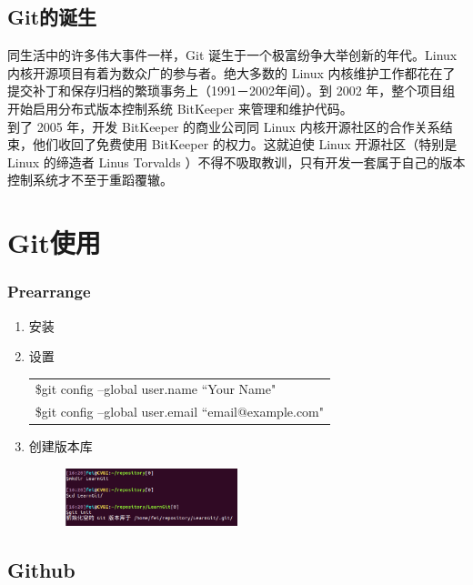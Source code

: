 \documentclass[notheorems,mathserif,table,compress]{beamer}  %
\begin{document}
\subsection{Git的诞生}

\begin{frame}
  同生活中的许多伟大事件一样，Git 诞生于一个极富纷争大举创新的年代。Linux 内核开源项目有着为数众广的参与者。绝大多数的 Linux 内核维护工作都花在了提交补丁和保存归档的繁琐事务上（1991－2002年间）。到 2002 年，整个项目组开始启用分布式版本控制系统   BitKeeper 来管理和维护代码。\\
  到了 2005 年，开发 BitKeeper 的商业公司同 Linux 内核开源社区的合作关系结束，他们收回了免费使用 BitKeeper 的权力。这就迫使 Linux 开源社区（特别是 Linux 的缔造者 Linus Torvalds ）不得不吸取教训，只有开发一套属于自己的版本控制系统才不至于重蹈覆辙。
\end{frame}

\section{Git使用}

\begin{frame}
  \frametitle{Prearrange}
  \flushleft
  \begin{enumerate}
  \item 安装
  \item 设置
  \newline
  \begin{tabular}{|l|}
  \hline
  \$git config --global user.name ``Your Name" \\
  \$git config --global user.email ``email@example.com"\\
  \hline
  \end{tabular}
  \item 创建版本库
  \begin{figure}[h]
  \centerline{\includegraphics[width=5cm]{repository.png}}
  \end{figure}
  \end{enumerate}
\end{frame}

\subsection{Github}
\end{document}
